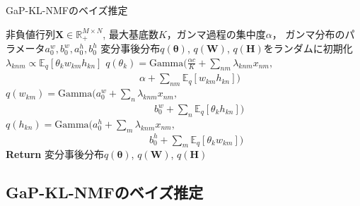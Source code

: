 \begin{algorithm}[t]
\caption{GaP-KL-NMFのベイズ推定}
\label{kl-nmf-vb}
\begin{algorithmic}[1]
\Require 非負値行列$\bm{X} \in \mathbb{R}_+^{M \times N}$, 
最大基底数$K$，ガンマ過程の集中度$\alpha$，
ガンマ分布のパラメータ$a_0^w,b_0^w,a_0^h,b_0^h$
\State 変分事後分布$q(\bm\theta)$, $q(\bm{W})$, $q(\bm{H})$をランダムに初期化
\State $\lambda_{knm} \propto \mathbb{E}_{q}[\theta_k w_{km} h_{kn}]$
\State $\textstyle q(\theta_k)
= \mbox{Gamma}(\frac{\alpha c}{K} + \sum_{nm} \lambda_{knm} x_{nm},$\\
\ \ \ \ \ \ \ \ \ \ \ \ \ \ \ \ \ \ \ \ \ \ \ \ \ \ \ $\alpha + \sum_{nm} \mathbb{E}_{q}[w_{km} h_{kn}])$
\State $\textstyle q(w_{km}) 
= \mbox{Gamma}(a_0^w + \sum_{n} \lambda_{knm} x_{nm},$\\
\ \ \ \ \ \ \ \ \ \ \ \ \ \ \ \ \ \ \ \ \ \ \ \ \ \ \ \ \ \ $b_0^w + \sum_{n} \mathbb{E}_{q}[\theta_k h_{kn}])$
\State $\textstyle q(h_{kn}) 
= \mbox{Gamma}(a_0^h + \sum_{m} \lambda_{knm} x_{nm},$\\
\ \ \ \ \ \ \ \ \ \ \ \ \ \ \ \ \ \ \ \ \ \ \ \ \ \ \ \ \ $b_0^h + \sum_{m} \mathbb{E}_{q}[\theta_k w_{km}])$
\EndWhile\\
{\bf Return} 変分事後分布$q(\bm\theta)$, $q(\bm{W})$, $q(\bm{H})$
\end{algorithmic}
\end{algorithm}

\subsection{GaP-KL-NMFのベイズ推定}
\label{sec:gap-kl-nmf}

